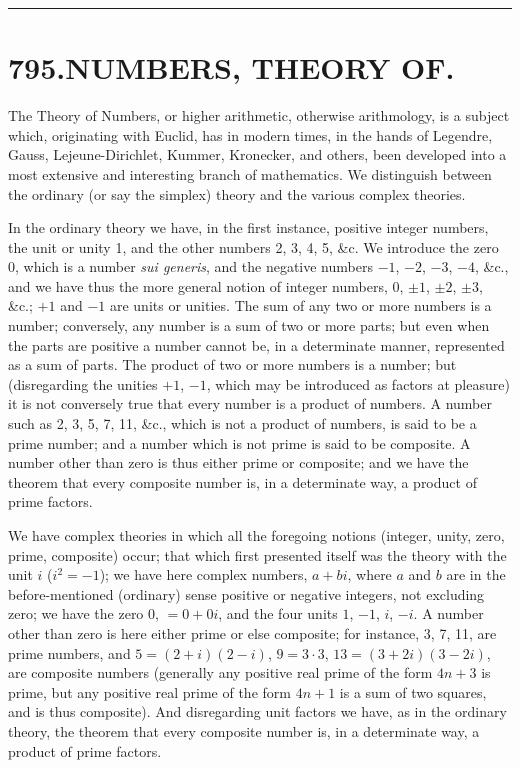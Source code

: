 \documentclass[11pt,a4paper]{book}
\begin{document}
\vspace{1em}
\hrule
\vspace{1em}



\section*{795.\quad NUMBERS, THEORY OF.}


\smallskip

The Theory of Numbers, or higher arithmetic, otherwise arithmology, is a subject which, originating with Euclid, has in modern times, in the hands of Legendre, Gauss, Lejeune-Dirichlet, Kummer, Kronecker, and others, been developed into a most extensive and interesting branch of mathematics. We distinguish between the ordinary (or say the simplex) theory and the various complex theories.

In the ordinary theory we have, in the first instance, positive integer numbers, the unit or unity 1, and the other numbers 2, 3, 4, 5, \&c. We introduce the zero 0, which is a number \textit{sui generis}, and the negative numbers $-1$, $-2$, $-3$, $-4$, \&c., and we have thus the more general notion of integer numbers, $0$, $\pm 1$, $\pm 2$, $\pm 3$, \&c.; $+1$ and $-1$ are units or unities. The sum of any two or more numbers is a number; conversely, any number is a sum of two or more parts; but even when the parts are positive a number cannot be, in a determinate manner, represented as a sum of parts. The product of two or more numbers is a number; but (disregarding the unities $+1$, $-1$, which may be introduced as factors at pleasure) it is not conversely true that every number is a product of numbers. A number such as 2, 3, 5, 7, 11, \&c., which is not a product of numbers, is said to be a prime number; and a number which is not prime is said to be composite. A number other than zero is thus either prime or composite; and we have the theorem that every composite number is, in a determinate way, a product of prime factors.

We have complex theories in which all the foregoing notions (integer, unity, zero, prime, composite) occur; that which first presented itself was the theory with the unit $i$ ($i^{2} = -1$); we have here complex numbers, $a + bi$, where $a$ and $b$ are in the before-mentioned (ordinary) sense positive or negative integers, not excluding zero; we have the zero $0$, $= 0 + 0i$, and the four units $1$, $-1$, $i$, $-i$. A number other than zero is here either prime or else composite; for instance, 3, 7, 11, are prime numbers, and $5 = (2 + i)(2 - i)$, $9 = 3 \cdot 3$, $13 = (3 + 2i)(3 - 2i)$, are composite numbers (generally any positive real prime of the form $4n + 3$ is prime, but any positive real prime of the form $4n + 1$ is a sum of two squares, and is thus composite). And disregarding unit factors we have, as in the ordinary theory, the theorem that every composite number is, in a determinate way, a product of prime factors.
\end{document}
